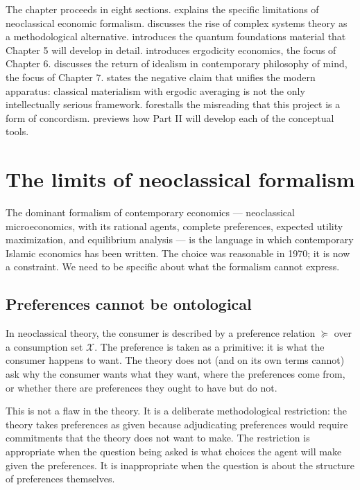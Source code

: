 The chapter proceeds in eight sections. 
explains the specific limitations of neoclassical economic
formalism.  discusses the rise of complex
systems theory as a methodological alternative.
 introduces the quantum
foundations material that Chapter 5 will develop in detail.
 introduces ergodicity economics, the
focus of Chapter 6.  discusses the return
of idealism in contemporary philosophy of mind, the focus of
Chapter 7.  states the negative claim that
unifies the modern apparatus: classical materialism with ergodic
averaging is not the only intellectually serious framework.
 forestalls the misreading that this
project is a form of concordism.  previews how
Part II will develop each of the conceptual tools.

\section{The limits of neoclassical formalism}
\label{sec:limits-neoclass}

The dominant formalism of contemporary economics --- neoclassical
microeconomics, with its rational agents, complete preferences,
expected utility maximization, and equilibrium analysis --- is the
language in which contemporary Islamic economics has been written.
The choice was reasonable in 1970; it is now a constraint. We need to
be specific about what the formalism cannot express.

\subsection{Preferences cannot be ontological}

In neoclassical theory, the consumer is described by a preference
relation $\succeq$ over a consumption set $\mathcal{X}$. The
preference is taken as a primitive: it is what the consumer happens
to want. The theory does not (and on its own terms cannot) ask why
the consumer wants what they want, where the preferences come from,
or whether there are preferences they ought to have but do not.

This is not a flaw in the theory. It is a deliberate methodological
restriction: the theory takes preferences as given because adjudicating
preferences would require commitments that the theory does not want
to make. The restriction is appropriate when the question being asked
is what choices the agent will make given the preferences. It is
inappropriate when the question is about the structure of preferences
themselves.

